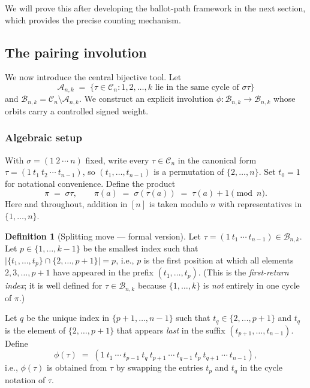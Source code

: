 \documentclass[12pt,a4paper]{article}
\theoremstyle{definition}
\newtheorem{definition}[theorem]{Definition}
\newcommand{\Cn}{\mathcal{C}_n}
\begin{document}
We will prove this after developing the ballot-path framework in the
next section, which provides the precise counting mechanism.

\subsection{The pairing involution}
\label{subsec:involution}

We now introduce the central bijective tool.  Let
\[
\mathcal{A}_{n,k} \;=\;
\bigl\{
  \tau\in\Cn : 1,2,\dots,k\text{ lie in the same cycle of }\sigma\tau
\bigr\}
\]
and $\mathcal{B}_{n,k} = \Cn\setminus\mathcal{A}_{n,k}$.  We construct
an explicit involution $\phi:\mathcal{B}_{n,k}\to\mathcal{B}_{n,k}$
whose orbits carry a controlled signed weight.

\subsubsection*{Algebraic setup}

With $\sigma=(1\ 2\ \cdots\ n)$ fixed, write every $\tau\in\Cn$
in the canonical form $\tau=(1\ t_1\ t_2\ \cdots\ t_{n-1})$, so
$(t_1,\dots,t_{n-1})$ is a permutation of $\{2,\dots,n\}$.  Set
$t_0=1$ for notational convenience.  Define the product
\[
\pi \;=\; \sigma\tau, \qquad \pi(a) \;=\; \sigma(\tau(a)) \;=\; \tau(a)+1
\pmod{n}.
\]
Here and throughout, addition in $[n]$ is taken modulo $n$ with
representatives in $\{1,\dots,n\}$.

\begin{definition}[Splitting move — formal version]
\label{def:split}
Let $\tau=(1\ t_1\ \cdots\ t_{n-1})\in\mathcal{B}_{n,k}$.  Let
$p\in\{1,\dots,k-1\}$ be the smallest index such that
$\bigl|\{t_1,\dots,t_p\}\cap\{2,\dots,p+1\}\bigr| = p$,
i.e., $p$ is the first position at which all elements
$2,3,\dots,p+1$ have appeared in the prefix $(t_1,\dots,t_p)$.
(This is the \emph{first-return index}; it is well defined for
$\tau\in\mathcal{B}_{n,k}$ because $\{1,\dots,k\}$ is \emph{not}
entirely in one cycle of $\pi$.)

Let $q$ be the unique index in $\{p+1,\dots,n-1\}$ such that
$t_q \in \{2,\dots,p+1\}$ and $t_q$ is the element of
$\{2,\dots,p+1\}$ that appears \emph{last} in the suffix
$(t_{p+1},\dots,t_{n-1})$.  Define
\[
\phi(\tau) \;=\; (1\ t_1\ \cdots\ t_{p-1}\ t_q\ t_{p+1}\ \cdots\ t_{q-1}\ t_p\ t_{q+1}\ \cdots\ t_{n-1}),
\]
i.e., $\phi(\tau)$ is obtained from $\tau$ by swapping the entries
$t_p$ and $t_q$ in the cycle notation of $\tau$.
\end{definition}
\end{document}
